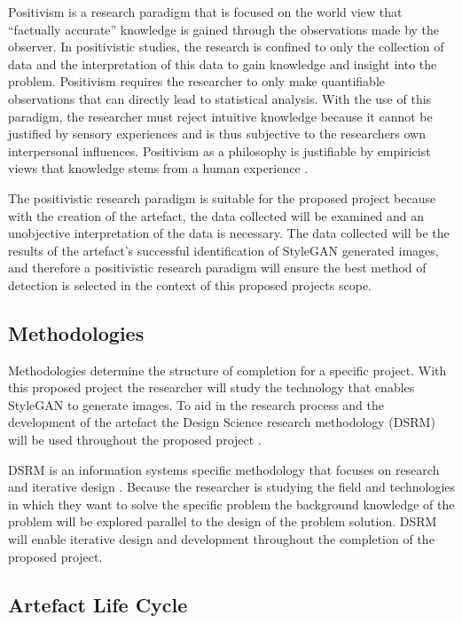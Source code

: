 Positivism is a research paradigm that is focused on the world view that “factually accurate” knowledge is gained through the observations made by the observer. In positivistic studies, the research is confined to only the collection of data and the interpretation of this data to gain knowledge and insight into the problem. Positivism requires the researcher to only make quantifiable observations that can directly lead to statistical analysis. With the use of this paradigm, the researcher must reject intuitive knowledge because it cannot be justified by sensory experiences and is thus subjective to the researchers own interpersonal influences. Positivism as a philosophy is justifiable by empiricist views that knowledge stems from a human experience \citep{Collins2018}.

The positivistic research paradigm is suitable for the proposed project because with the creation of the artefact, the data collected will be examined and an unobjective interpretation of the data is necessary. The data collected will be the results of the artefact’s successful identification of StyleGAN generated images, and therefore a positivistic research paradigm will ensure the best method of detection is selected in the context of this proposed projects scope.

\subsection{Methodologies}

Methodologies determine the structure of completion for a specific project. With this proposed project the researcher will study the technology that enables StyleGAN to generate images. To aid in the research process and the development of the artefact the Design Science research methodology (DSRM) will be used throughout the proposed project \citep{Peffers2007}.

DSRM is an information systems specific methodology that focuses on research and iterative design \citep{Peffers2007}. Because the researcher is studying the field and technologies in which they want to solve the specific problem the background knowledge of the problem will be explored parallel to the design of the problem solution. DSRM will enable iterative design and development throughout the completion of the proposed project.

\subsection{Artefact Life Cycle}

